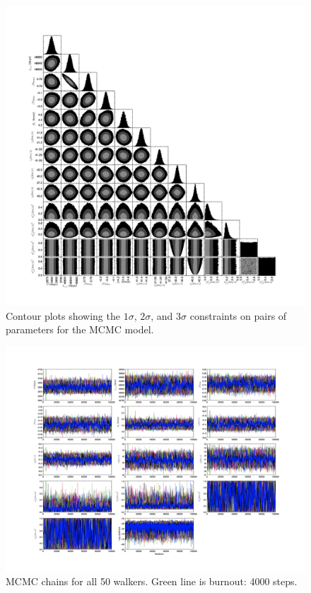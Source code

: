\documentclass{article}
\begin{document}
\begin{figure}[!htb]
\centering
\includegraphics[width=\textwidth]{corner_100000_gammas.jpg}
\caption{Contour plots showing the $1 \sigma$, $2 \sigma$, and $3 \sigma$ constraints on pairs of parameters for the MCMC model.}
\end{figure}


\begin{figure}[!htb]
\centering
\includegraphics[width=\textwidth]{chainPlot_100000_gammas.jpg}
\caption{MCMC chains for all 50 walkers. Green line is burnout: 4000 steps.}
\end{figure}
\end{document}
